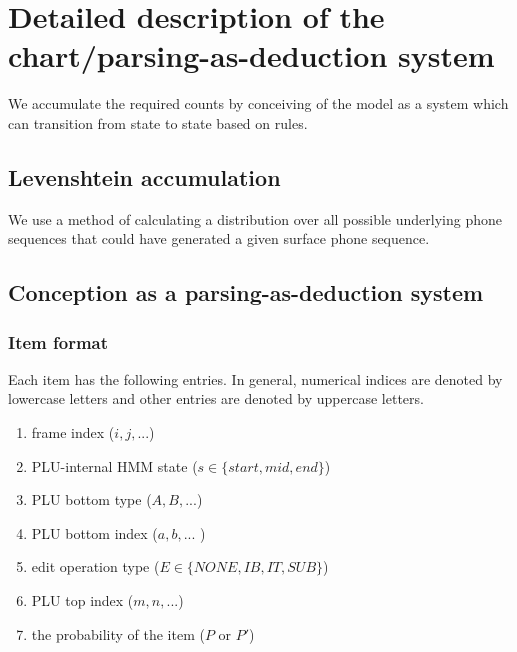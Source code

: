 \documentclass[11pt]{article}
\begin{document}
\section{Detailed description of the chart/parsing-as-deduction system}
We accumulate the required counts by conceiving of the model as a system which can transition from state to state based on rules.

 \subsection{Levenshtein accumulation}
 
 We use a method of calculating a distribution over all possible underlying phone sequences that could have generated a given surface phone sequence. 
 
 \subsection{Conception as a parsing-as-deduction system}
 
\subsubsection{Item format}
Each item has the following entries. In general, numerical indices are denoted by lowercase letters and other entries are denoted by uppercase letters. 
\begin{enumerate}
\item frame index ($i, j, ...$)
\item PLU-internal HMM state ($s \in \{start, mid, end\}$)
\item PLU bottom type ($A, B, ...$)
\item PLU bottom index ($a, b, ...$ )
\item edit operation type ($E \in \{NONE, IB, IT, SUB\}$)
\item PLU top index ($m, n, ...$)
\item the probability of the item ($P$ or $P'$)
\end{enumerate}
\end{document}
